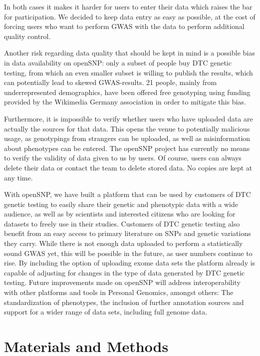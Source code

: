 \documentclass[10pt]{article}
\begin{document}
In both cases it makes it harder 
for users to enter their data which raises the bar for participation.
We decided to keep data entry as easy as possible, at the cost of forcing users who want to perform GWAS with the data to perform additional quality control.

Another risk regarding data quality that should be kept in mind is a possible bias in data availability on openSNP: only a subset of people buy DTC genetic testing, from which an even smaller subset is willing to publish the results, which can potentially lead to skewed GWAS-results. 21 people, mainly from underrepresented demographics, have been offered free genotyping using funding provided by the Wikimedia Germany association in order to mitigate this bias. 

Furthermore, it is impossible to verify whether users who have uploaded data are actually the sources for that data. This opens the venue to potentially malicious usage, as genotypings from strangers can be uploaded, as well as misinformation about phenotypes can be entered. The openSNP project has currently no means to verify the validity of data given to us by users. Of course, users can always delete their data or contact the team to delete stored data. No copies are kept at any time.

With openSNP, we have built a platform that can be used by customers of DTC genetic testing to easily share their genetic and phenotypic 
data with a wide audience, as well as by scientists and interested citizens who are looking for datasets to freely use in their studies.
Customers of DTC genetic testing also benefit from an easy access to primary literature on SNPs and genetic variations they carry. 
While there is not enough data uploaded to perform a statistically sound GWAS yet, this will be possible in the future, as user numbers continue to rise. By including the option of uploading exome data sets the platform already is capable of adjusting for changes in the type of data generated by DTC genetic testing. Future improvements made on openSNP will address interoperability with other platforms and tools in Personal Genomics, amongst others: The standardization of phenotypes, the inclusion of further annotation sources and support for a wider range of data sets, including full genome data.

 
\section*{Materials and Methods}
\end{document}

